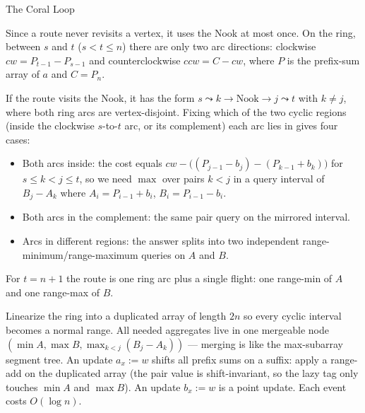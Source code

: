 \begin{tutorial}{The Coral Loop}

Since a route never revisits a vertex, it uses the Nook at most once. On the ring, between $s$ and $t$ ($s < t \le n$) there are only two arc directions: clockwise $cw = P_{t-1} - P_{s-1}$ and counterclockwise $ccw = C - cw$, where $P$ is the prefix-sum array of $a$ and $C = P_n$.

If the route visits the Nook, it has the form $s \leadsto k \to \text{Nook} \to j \leadsto t$ with $k \neq j$, where both ring arcs are vertex-disjoint. Fixing which of the two cyclic regions (inside the clockwise $s$-to-$t$ arc, or its complement) each arc lies in gives four cases:

\begin{itemize}
\item Both arcs inside: the cost equals $cw - \bigl((P_{j-1} - b_j) - (P_{k-1} + b_k)\bigr)$ for $s \le k < j \le t$, so we need $\max$ over pairs $k < j$ in a query interval of $B_j - A_k$ where $A_i = P_{i-1} + b_i$, $B_i = P_{i-1} - b_i$.
\item Both arcs in the complement: the same pair query on the mirrored interval.
\item Arcs in different regions: the answer splits into two independent range-minimum/range-maximum queries on $A$ and $B$.
\end{itemize}

For $t = n+1$ the route is one ring arc plus a single flight: one range-min of $A$ and one range-max of $B$.

Linearize the ring into a duplicated array of length $2n$ so every cyclic interval becomes a normal range. All needed aggregates live in one mergeable node $(\min A, \max B, \max_{k<j}(B_j - A_k))$ --- merging is like the max-subarray segment tree. An update $a_x := w$ shifts all prefix sums on a suffix: apply a range-add on the duplicated array (the pair value is shift-invariant, so the lazy tag only touches $\min A$ and $\max B$). An update $b_x := w$ is a point update. Each event costs $O(\log n)$.


\end{tutorial}
